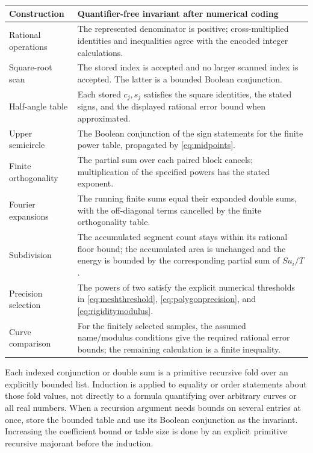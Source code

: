 \documentclass[11pt,a4paper]{article}
\theoremstyle{definition}
\begin{document}
\begin{longtable}{@{}p{}p{}@{}}
\toprule
Construction & Quantifier-free invariant after numerical coding\\
\midrule
\endhead
Rational operations &
The represented denominator is positive; cross-multiplied identities
and inequalities agree with the encoded integer calculations.\\
Square-root scan &
The stored index is accepted and no larger scanned index is accepted.
The latter is a bounded Boolean conjunction.\\
Half-angle table &
Each stored \(c_j,s_j\) satisfies the square identities, the stated
signs, and the displayed rational error bound when approximated.\\
Upper semicircle &
The Boolean conjunction of the sign statements for the finite power
table, propagated by \eqref{eq:midpoints}.\\
Finite orthogonality &
The partial sum over each paired block cancels; multiplication of the
specified powers has the stated exponent.\\
Fourier expansions &
The running finite sums equal their expanded double sums, with the
off-diagonal terms cancelled by the finite orthogonality table.\\
Subdivision &
The accumulated segment count stays within its rational floor bound;
the accumulated area is unchanged and the energy is bounded by the
corresponding partial sum of \(Su_i/T\).\\
Precision selection &
The powers of two satisfy the explicit numerical thresholds in
\eqref{eq:meshthreshold}, \eqref{eq:polygonprecision}, and
\eqref{eq:rigiditymodulus}.\\
Curve comparison &
For the finitely selected samples, the assumed name/modulus conditions
give the required rational error bounds; the remaining calculation is
a finite inequality.\\
\bottomrule
\end{longtable}

Each indexed conjunction or double sum is a primitive recursive fold
over an explicitly bounded list. Induction is applied to equality or
order statements about those fold values, not directly to a formula
quantifying over arbitrary curves or all real numbers. When a
recursion argument needs bounds on several entries at once, store the
bounded table and use its Boolean conjunction as the invariant.
Increasing the coefficient bound or table size is done by an explicit
primitive recursive majorant before the induction.
\end{document}
